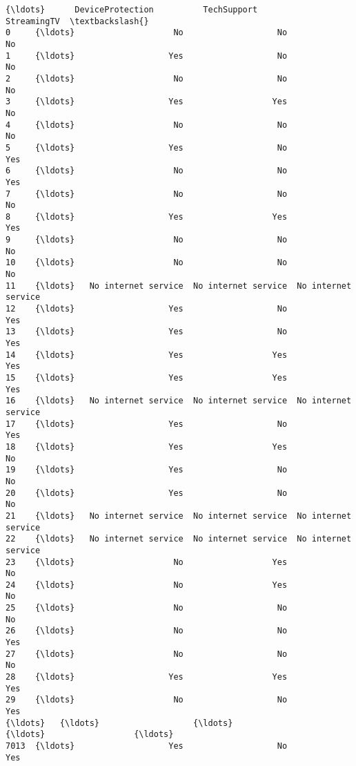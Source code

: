 \documentclass[11pt]{article}
\begin{document}
\begin{tcolorbox}[breakable, boxrule=.5pt, size=fbox, pad at break*=1mm, opacityfill=0]
\begin{Verbatim}[commandchars=\\\{\}]
      {\ldots}      DeviceProtection          TechSupport          StreamingTV  \textbackslash{}
0     {\ldots}                    No                   No                   No
1     {\ldots}                   Yes                   No                   No
2     {\ldots}                    No                   No                   No
3     {\ldots}                   Yes                  Yes                   No
4     {\ldots}                    No                   No                   No
5     {\ldots}                   Yes                   No                  Yes
6     {\ldots}                    No                   No                  Yes
7     {\ldots}                    No                   No                   No
8     {\ldots}                   Yes                  Yes                  Yes
9     {\ldots}                    No                   No                   No
10    {\ldots}                    No                   No                   No
11    {\ldots}   No internet service  No internet service  No internet service
12    {\ldots}                   Yes                   No                  Yes
13    {\ldots}                   Yes                   No                  Yes
14    {\ldots}                   Yes                  Yes                  Yes
15    {\ldots}                   Yes                  Yes                  Yes
16    {\ldots}   No internet service  No internet service  No internet service
17    {\ldots}                   Yes                   No                  Yes
18    {\ldots}                   Yes                  Yes                   No
19    {\ldots}                   Yes                   No                   No
20    {\ldots}                   Yes                   No                   No
21    {\ldots}   No internet service  No internet service  No internet service
22    {\ldots}   No internet service  No internet service  No internet service
23    {\ldots}                    No                  Yes                   No
24    {\ldots}                    No                  Yes                   No
25    {\ldots}                    No                   No                   No
26    {\ldots}                    No                   No                  Yes
27    {\ldots}                    No                   No                   No
28    {\ldots}                   Yes                  Yes                  Yes
29    {\ldots}                    No                   No                  Yes
{\ldots}   {\ldots}                   {\ldots}                  {\ldots}                  {\ldots}
7013  {\ldots}                   Yes                   No                  Yes

\end{Verbatim}
\end{tcolorbox}
\end{document}

